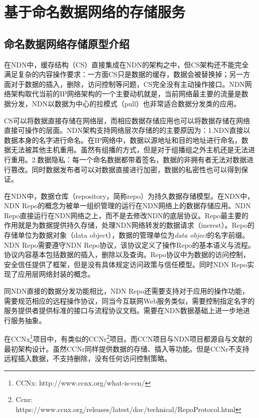 

\chapter{基于命名数据网络的存储服务}
\label{repo}

\section{命名数据网络存储原型介绍}
在NDN中，缓存结构（CS）直接集成在NDN的架构之中，但CS架构还不能完全满足复杂的内容操作要求：一方面CS只是数据的缓存，数据会被替换掉；另一方面对于数据的插入，删除，访问控制等问题，CS完全没有主动操作接口。NDN网络架构取代当前的IP网络架构的一个主要动机就是，当前网络最主要的流量是数据分发，NDN以数据为中心的拉模式（pull）也非常适合数据分发类的应用。

CS可以将数据直接存储在网络层，而相应数据存储应用也可以将数据存储在网络直接可操作的层面。NDN架构支持网络层次存储的的主要原因为：1.NDN直接以数据本身的名字进行命名。在IP网络中，数据以源地址和目的地址进行命名，数据无法被其他主机重用。虽然有组播的方式，但是对于组播组之外主机还是无法进行重用。2.数据隐私：每一个命名数据都带着签名，数据的非拥有者无法对数据进行篡改。同时数据发布者可以对数据直接进行加密，数据的私密性也可以得到保证。

在NDN中，数据仓库（repository，简称repo）为持久数据存储模型。在NDN中，NDN Repo的概念为被单一组织管理的运行在NDN网络上的数据存储应用。NDN Repo直接运行在NDN网络之上，而不是去修改NDN的底层协议。Repo最主要的作用就是为数据提供持久存储，处理NDN网络转发的数据请求（inerest）。Repo的存储单位为数据对象（data object），数据的管理单位为\textit{data object}的名字前缀。NDN Repo需要遵守NDN Repo协议，该协议定义了操作Repo的基本语义与流程。协议内容基本包括数据的插入，删除以及查询。Repo协议中为数据的访问控制，安全信任提供了框架，但是没有具体规定访问政策与信任模型。同时NDN Repo实现了应用层网络封装的概念。\cite{clark1990architectural}

同NDN直接的数据分发功能相比，NDN Repo还需要支持对于应用的操作功能，需要规范相应的远程操作协议，同当今互联网Web服务类似，需要控制指定名字的服务提供者提供标准的接口与流程协议文档。需要在NDN数据基础上进一步地进行服务抽象。

在CCNx\footnote{CCNx: http://www.ccnx.org/what-is-ccn/}项目中，有类似的CCNr\footnote{Ccnr: https://www.ccnx.org/releases/latest/doc/technical/RepoProtocol.html}项目。而CCN项目与NDN项目都源自与文献\cite{jacobson2009networking}的最初架构设计。虽然CCNr同样提供数据的存储、插入等功能。但是CCNr不支持远程插入数据，不支持删除，没有任何访问控制策略。

